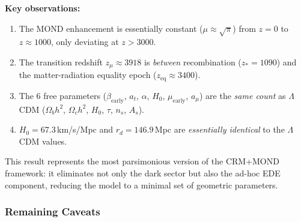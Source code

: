 \documentclass[aps,prd,twocolumn,superscriptaddress,nofootinbib]{revtex4-2}
\begin{document}
\textbf{Key observations:}
\begin{enumerate}
\item The MOND enhancement is essentially constant ($\mu \approx \sqrt{\pi}$) from $z = 0$ to $z \approx 1000$, only deviating at $z > 3000$.
\item The transition redshift $z_\mu \approx 3918$ is \textit{between} recombination ($z_* = 1090$) and the matter-radiation equality epoch ($z_{\mathrm{eq}} \approx 3400$).
\item The 6 free parameters ($\beta_{\mathrm{early}}$, $a_t$, $\alpha$, $H_0$, $\mu_{\mathrm{early}}$, $a_\mu$) are the \textit{same count} as $\Lambda$CDM ($\Omega_b h^2$, $\Omega_c h^2$, $H_0$, $\tau$, $n_s$, $A_s$).
\item $H_0 = 67.3$\,km/s/Mpc and $r_d = 146.9$\,Mpc are \textit{essentially identical} to the $\Lambda$CDM values.
\end{enumerate}

This result represents the most parsimonious version of the CRM+MOND framework: it eliminates not only the dark sector but also the ad-hoc EDE component, reducing the model to a minimal set of geometric parameters.

\subsubsection{Remaining Caveats}
\label{subsubsec:caveats}
\end{document}
